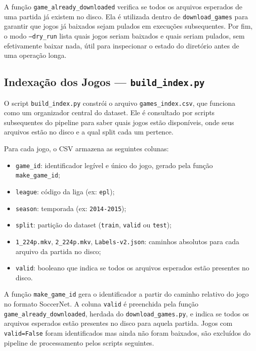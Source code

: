 \documentclass[12pt, a4paper]{article}
\begin{document}
A função \texttt{game\_already\_downloaded} verifica se todos os arquivos esperados de uma partida já existem no disco. Ela é utilizada dentro de \texttt{download\_games} para garantir que jogos já baixados sejam pulados em execuções subsequentes. Por fim, o modo \texttt{--dry\_run} lista quais jogos seriam baixados e quais seriam pulados, sem efetivamente baixar nada, útil para inspecionar o estado do diretório antes de uma operação longa.

\subsection{Indexação dos Jogos — \texttt{build\_index.py}}

O script \texttt{build\_index.py} constrói o arquivo \texttt{games\_index.csv}, que funciona como um organizador central do dataset. Ele é consultado por scripts subsequentes do pipeline para saber quais jogos estão disponíveis, onde seus arquivos estão no disco e a qual split cada um pertence.

Para cada jogo, o CSV armazena as seguintes colunas:

\begin{itemize}
    \item \texttt{game\_id}: identificador legível e único do jogo, gerado pela função \texttt{make\_game\_id};
    \item \texttt{league}: código da liga (ex: \texttt{epl});
    \item \texttt{season}: temporada (ex: \texttt{2014-2015});
    \item \texttt{split}: partição do dataset (\texttt{train}, \texttt{valid} ou \texttt{test});
    \item \texttt{1\_224p.mkv}, \texttt{2\_224p.mkv}, \texttt{Labels-v2.json}: caminhos absolutos para cada arquivo da partida no disco;
    \item \texttt{valid}: booleano que indica se todos os arquivos esperados estão presentes no disco.
\end{itemize}

A função \texttt{make\_game\_id} gera o identificador a partir do caminho relativo do jogo no formato SoccerNet. A coluna \texttt{valid} é preenchida pela função \texttt{game\_already\_downloaded}, herdada do \texttt{download\_games.py}, e indica se todos os arquivos esperados estão presentes no disco para aquela partida. Jogos com \texttt{valid=False} foram identificados mas ainda não foram baixados, são excluídos do pipeline de processamento pelos scripts seguintes.
\end{document}

